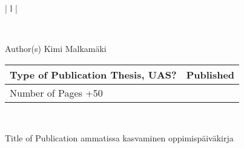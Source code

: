 \begin{tabular}{ | l | }

    \\

    \hline
    \begin{minipage}[b]{6cm}
        Author(s)
        \newline
        Kimi Malkamäki 
    \end{minipage}%
    \begin{minipage}{8.5cm}
        \begin{tabular}{ | l | c | }
            \begin{minipage}[t][1cm][t]{4.25cm}
                Type of Publication 
                \newline
                Thesis, UAS?
            \end{minipage} & %
            \begin{minipage}{3.6cm}
                Published
                \newline
                2024
            \end{minipage} \\ \hline%
            \begin{minipage}[t][1.01cm][t]{4.25cm}
                Number of Pages
                \newline 
                31+50
            \end{minipage}
            &  \\ \hline
        \end{tabular}
    \end{minipage}%
      \\ \hline

    \begin{minipage}[t][2cm][t]{8cm}
    Title of Publication
        \newline 
    ammatissa kasvaminen 
        \newline 
    oppimispäiväkirja  
    \end{minipage}\\ \hline


\end{tabular}

